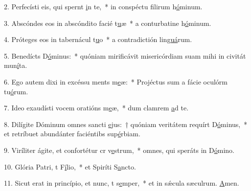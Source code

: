 2. Perfecísti eis, qui spernt \uline{i}n te,~* in conspéctu filirum h\uline{ó}minum.\par 
3. Abscóndes eos in abscóndito facié t\uline{u}æ~* a conturbatine h\uline{ó}minum.\par 
4. Próteges eos in tabernácul t\uline{u}o~* a contradictión lin\uline{guá}rum.\par 
5. Benedícts D\uline{ó}minus:~* quóniam mirificávit misericórdiam suam mihi in civitát mun\uline{í}ta.\par 
6. Ego autem dixi in excéssu ments m\uline{e}æ:~* Projéctus sum a fácie oculórm tu\uline{ó}rum.\par 
7. Ideo exaudísti vocem oratións m\uline{e}æ,~* dum clamrem \uline{a}d te.\par 
8. Dilígite Dóminum omnes sancti \uline{e}jus:~† quóniam veritátem requírt D\uline{ó}minus,~* et retríbuet abundánter faciéntibs sup\uline{é}rbiam.\par 
9. Viríliter ágite, et confortétur cr v\uline{e}strum,~* omnes, qui speráts in D\uline{ó}mino.\par 
10. Glória Patri, t F\uline{í}lio,~* et Spiríti S\uline{a}ncto.\par 
11. Sicut erat in princípio, et nunc, t s\uline{e}mper,~* et in sǽcula sæculrum. \uline{A}men.\par 
